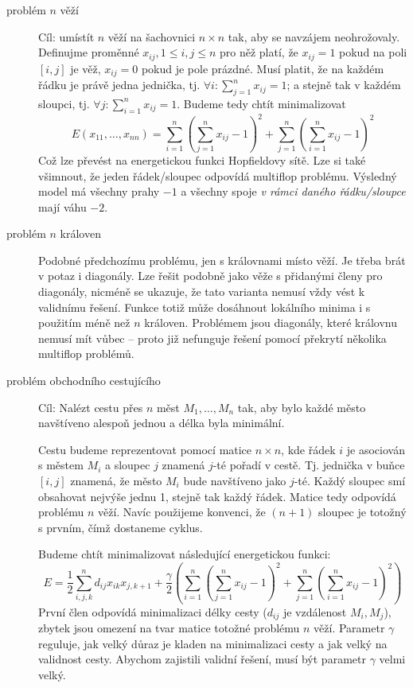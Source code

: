 \documentclass[11pt]{report} %
\numberwithin{equation}{section}
\begin{document}
\begin{description}
	\item[problém $n$ věží] Cíl: umístít $n$ věží na šachovnici $n\times n$ tak, aby se navzájem neohrožovaly. Definujme proměnné $x_{ij}, 1 \leq i,j \leq n$ pro něž platí, že $x_{ij} = 1$ pokud na poli $[i,j]$ je věž, $x_{ij} = 0$ pokud je pole prázdné. Musí platit, že na každém řádku je právě jedna jednička, tj. $\forall i : \sum_{j=1}^{n} x_{ij} = 1 $; a stejně tak v každém sloupci, tj. $\forall j : \sum_{i=1}^{n} x_{ij} = 1 $. Budeme tedy chtít minimalizovat
	$$E(x_{11}, \dots, x_{nn}) = \sum_{i=1}^{n}\left(\sum_{j=1}^{n} x_{ij} - 1\right)^2 + \sum_{j=1}^{n}\left(\sum_{i=1}^{n} x_{ij} - 1\right)^2$$
	Což lze převést na energetickou funkci Hopfieldovy sítě. Lze si také všimnout, že jeden řádek/sloupec odpovídá multiflop problému. Výsledný model má všechny prahy $-1$ a všechny spoje \textit{v rámci daného řádku/sloupce} mají váhu $-2$.
	
	\item[problém $n$ královen] Podobné předchozímu problému, jen s královnami místo věží. Je třeba brát v potaz i diagonály. Lze řešit podobně jako věže s přidanými členy pro diagonály, nicméně se ukazuje, že tato varianta nemusí vždy vést k validnímu řešení. Funkce totiž může dosáhnout lokálního minima i s použitím méně než $n$ královen. Problémem jsou diagonály, které královnu nemusí mít vůbec -- proto již nefunguje řešení pomocí překrytí několika multiflop problémů.
	
	\item[problém obchodního cestujícího] Cíl: Nalézt cestu přes $n$ měst $M_1, \dots, M_n$ tak, aby bylo každé město navštíveno alespoň jednou a délka  byla minimální.
	
	Cestu budeme reprezentovat pomocí matice $n \times n$, kde řádek $i$ je asociován s městem $M_i$ a sloupec $j$ znamená $j$-té pořadí v cestě. Tj. jednička v buňce $[i,j]$ znamená, že město $M_i$ bude navštíveno jako $j$-té. Každý sloupec smí obsahovat nejvýše jednu 1, stejně tak každý řádek. Matice tedy odpovídá problému $n$ věží. Navíc použijeme konvenci, že $(n+1)$ sloupec je totožný s prvním, čímž dostaneme cyklus.
	
	Budeme chtít minimalizovat následující energetickou funkci:
	$$E = \frac{1}{2}\sum\limits_{i,j,k}^{n}d_{ij}x_{ik}x_{j,k+1} + \frac{\gamma}{2}\left(\sum\limits_{i=1}^{n}\left(\sum\limits_{j=1}^{n} x_{ij} - 1 \right)^2 + \sum\limits_{j=1}^{n}\left(\sum\limits_{i=1}^{n} x_{ij} - 1 \right)^2\right)$$
	První člen odpovídá minimalizaci délky cesty ($d_{ij}$ je vzdálenost $M_i, M_j$), zbytek jsou omezení na tvar matice totožné problému $n$ věží. Parametr $\gamma$ reguluje, jak velký důraz je kladen na minimalizaci cesty a jak velký na validnost cesty. Abychom zajistili validní řešení, musí být parametr $\gamma$ velmi velký.
	

\end{description}
\end{document}
